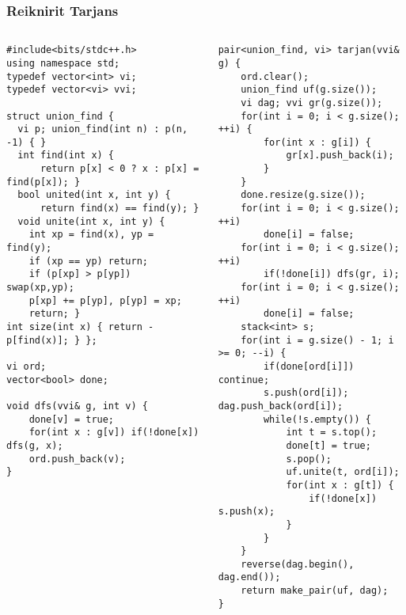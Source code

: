 \documentclass{beamer}
\begin{document}
\begin{frame}[fragile]
\frametitle{Reiknirit Tarjans}

\begin{columns}
\begin{column}{0.5\textwidth}
\begin{tiny}
\begin{verbatim}
#include<bits/stdc++.h>
using namespace std;
typedef vector<int> vi;
typedef vector<vi> vvi;

struct union_find {
  vi p; union_find(int n) : p(n, -1) { }
  int find(int x) { 
      return p[x] < 0 ? x : p[x] = find(p[x]); }
  bool united(int x, int y) { 
      return find(x) == find(y); }
  void unite(int x, int y) {
    int xp = find(x), yp = find(y);
    if (xp == yp) return;
    if (p[xp] > p[yp]) swap(xp,yp);
    p[xp] += p[yp], p[yp] = xp;
    return; }
int size(int x) { return -p[find(x)]; } };

vi ord;
vector<bool> done;

void dfs(vvi& g, int v) {
    done[v] = true;
    for(int x : g[v]) if(!done[x]) dfs(g, x);
    ord.push_back(v);
}
\end{verbatim}
\end{tiny}
\end{column}

\begin{column}{0.5\textwidth}
\begin{tiny}
\begin{verbatim}
pair<union_find, vi> tarjan(vvi& g) {
    ord.clear();
    union_find uf(g.size());
    vi dag; vvi gr(g.size());
    for(int i = 0; i < g.size(); ++i) {
        for(int x : g[i]) {
            gr[x].push_back(i);
        }
    }
    done.resize(g.size());
    for(int i = 0; i < g.size(); ++i) 
        done[i] = false;
    for(int i = 0; i < g.size(); ++i) 
        if(!done[i]) dfs(gr, i);
    for(int i = 0; i < g.size(); ++i) 
        done[i] = false;
    stack<int> s;
    for(int i = g.size() - 1; i >= 0; --i) {
        if(done[ord[i]]) continue;
        s.push(ord[i]); dag.push_back(ord[i]);
        while(!s.empty()) {
            int t = s.top();
            done[t] = true;
            s.pop();
            uf.unite(t, ord[i]);
            for(int x : g[t]) {
                if(!done[x]) s.push(x);
            }
        }
    }
    reverse(dag.begin(), dag.end());
    return make_pair(uf, dag);
}
\end{verbatim}
\end{tiny}
\end{column}
\end{columns}

\end{frame}
\end{document}
